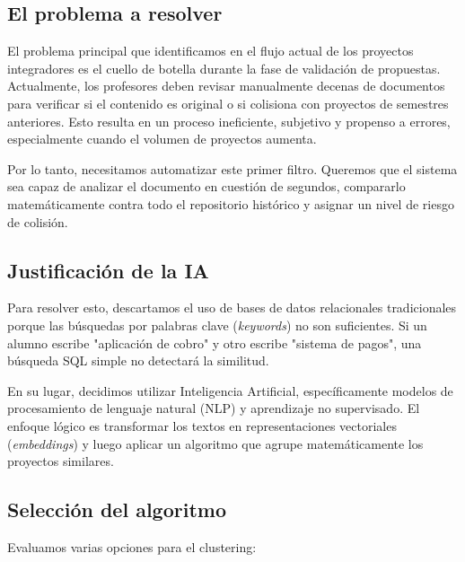 

\subsection{El problema a resolver}

El problema principal que identificamos en el flujo actual de los proyectos integradores es el cuello de botella durante la fase de validación de propuestas. Actualmente, los profesores deben revisar manualmente decenas de documentos para verificar si el contenido es original o si colisiona con proyectos de semestres anteriores. Esto resulta en un proceso ineficiente, subjetivo y propenso a errores, especialmente cuando el volumen de proyectos aumenta.

Por lo tanto, necesitamos automatizar este primer filtro. Queremos que el sistema sea capaz de analizar el documento en cuestión de segundos, compararlo matemáticamente contra todo el repositorio histórico y asignar un nivel de riesgo de colisión.

\subsection{Justificación de la IA}

Para resolver esto, descartamos el uso de bases de datos relacionales tradicionales porque las búsquedas por palabras clave (\textit{keywords}) no son suficientes. Si un alumno escribe "aplicación de cobro" y otro escribe "sistema de pagos", una búsqueda SQL simple no detectará la similitud. 

En su lugar, decidimos utilizar Inteligencia Artificial, específicamente modelos de procesamiento de lenguaje natural (NLP) y aprendizaje no supervisado. El enfoque lógico es transformar los textos en representaciones vectoriales (\textit{embeddings}) y luego aplicar un algoritmo que agrupe matemáticamente los proyectos similares. 

\subsection{Selección del algoritmo}

Evaluamos varias opciones para el clustering:

